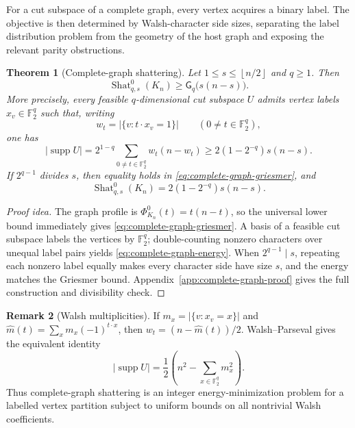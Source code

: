 \documentclass[11pt,letterpaper]{article}
\theoremstyle{plain}
\newtheorem{theorem}{Theorem}[section]
\theoremstyle{definition}
\newtheorem{remark}[theorem]{Remark}
\newcommand{\F}{\mathbb{F}_2}
\newcommand{\supp}{\operatorname{supp}}
\newcommand{\Shat}{\operatorname{Shat}}
\newcommand{\1}{\mathbf{1}}
\newcommand{\abs}[1]{\left|#1\right|}
\newcommand{\floor}[1]{\left\lfloor#1\right\rfloor}
\begin{document}
For a cut subspace of a complete graph, every vertex acquires a binary label.  The
objective is then determined by Walsh-character side sizes, separating the label
distribution problem from the geometry of the host graph and exposing the relevant
parity obstructions.

\begin{theorem}[Complete-graph shattering]\label{thm:complete-graph}
Let $1\le s\le\floor{n/2}$ and $q\ge1$.  Then
\begin{equation}\label{eq:complete-graph-griesmer}
 \Shat_{q,s}^0(K_n)\ge
 \mathsf G_q\bigl(s(n-s)\bigr).
\end{equation}
More precisely, every feasible $q$-dimensional cut subspace $U$ admits vertex labels
$x_v\in\F^q$ such that, writing
\[
 w_t=\abs{\{v:t\cdot x_v=1\}}
 \qquad(0\ne t\in\F^q),
\]
one has
\begin{equation}\label{eq:complete-graph-energy}
 \abs{\supp U}
 =2^{1-q}\sum_{0\ne t\in\F^q}w_t(n-w_t)
 \ge 2(1-2^{-q})s(n-s).
\end{equation}
If $2^{q-1}$ divides $s$, then equality holds in
\eqref{eq:complete-graph-griesmer}, and
\begin{equation}\label{eq:complete-graph-exact}
 \Shat_{q,s}^0(K_n)=2(1-2^{-q})s(n-s).
\end{equation}
\end{theorem}

\begin{proof}[Proof idea]
The graph profile is $\Phi_{K_n}^0(t)=t(n-t)$, so the universal lower bound immediately
gives \eqref{eq:complete-graph-griesmer}.  A basis of a feasible cut subspace labels the
vertices by $\F^q$; double-counting nonzero characters over unequal label pairs yields
\eqref{eq:complete-graph-energy}.  When $2^{q-1}\mid s$, repeating each nonzero label
equally makes every character side have size $s$, and the energy matches the Griesmer
bound.  Appendix~\ref{app:complete-graph-proof} gives the full construction and
divisibility check.
\end{proof}

\begin{remark}[Walsh multiplicities]\label{rem:walsh}
If $m_x=\abs{\{v:x_v=x\}}$ and
$\widehat m(t)=\sum_x m_x(-1)^{t\cdot x}$, then
$w_t=(n-\widehat m(t))/2$.  Walsh--Parseval gives the equivalent identity
\[
 \abs{\supp U}=\frac12\left(n^2-\sum_{x\in\F^q}m_x^2\right).
\]
Thus complete-graph shattering is an integer energy-minimization problem for a labelled
vertex partition subject to uniform bounds on all nontrivial Walsh coefficients.
\end{remark}
\end{document}
